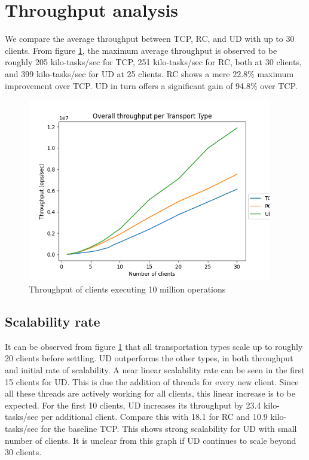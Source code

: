 \section{Throughput analysis}\label{sec:throughput-analysis}
We compare the average throughput between TCP, RC, and UD with up to 30 clients.
From figure \ref{fig:throughput-30}, the maximum average throughput is observed to be roughly 205 kilo-tasks/sec for TCP, 251 kilo-tasks/sec for RC, both at 30 clients, and 399 kilo-tasks/sec for UD at 25 clients.
RC shows a mere 22.8\% maximum improvement over TCP.
UD in turn offers a significant gain of 94.8\% over TCP.
\begin{figure}
    \centering
    \includegraphics[height=80mm]{figures/PNG/Throughput_30.png}
    \caption{Throughput of clients executing 10 million operations}
    \label{fig:throughput-30}
\end{figure}

\subsection{Scalability rate}\label{subsec:scalability-rate}
It can be observed from figure \ref{fig:throughput-30} that all transportation types scale up to roughly 20 clients before settling.
UD outperforms the other types, in both throughput and initial rate of scalability.
A near linear scalability rate can be seen in the first 15 clients for UD.
This is due the addition of threads for every new client.
Since all these threads are actively working for all clients, this linear increase is to be expected.
For the first 10 clients, UD increases its throughput by 23.4 kilo-tasks/sec per additional client.
Compare this with 18.1 for RC and 10.9 kilo-tasks/sec for the baseline TCP.
This shows strong scalability for UD with small number of clients.
It is unclear from this graph if UD continues to scale beyond 30 clients.

